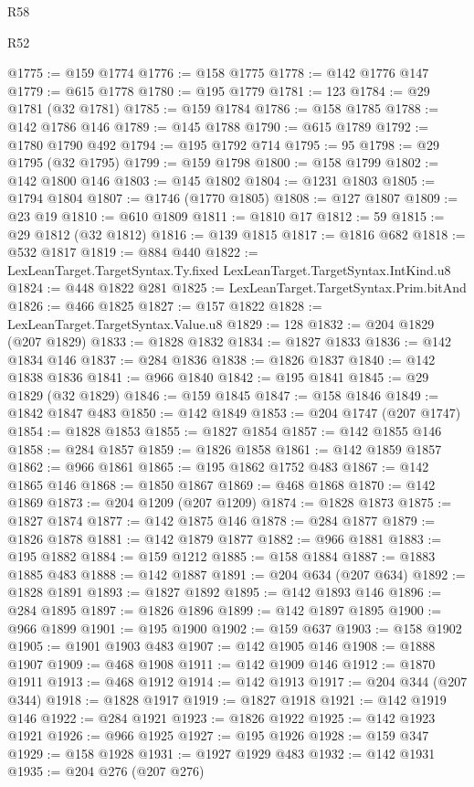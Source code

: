 \begin{lexlean}{R58}
\begin{lexlean}{R52}
\begin{coremodule}
{{{{{{{{{{{{{{{{{{{{{{{{{{{{{{{{{{{{{{{{{{{{{{{{{{{{{{{{{{{{{{{{{{{{{{{{{{{{{{{{{{{{{{{{{{{{{{{{{{{{{{{{{{{{{{{{{{{{{{{{{{{{{{{{{{{{{{{{{{{{{{{{{{{{{{{{{{{{{{{{{{{{{{{{{{{{{{{{{{{{{{{{{{{{{{{{{{{{{{@1775 := @159 @1774
@1776 := @158 @1775
@1778 := @142 @1776 @147
@1779 := @615 @1778
@1780 := @195 @1779
@1781 := 123
@1784 := @29 @1781 (@32 @1781)
@1785 := @159 @1784
@1786 := @158 @1785
@1788 := @142 @1786 @146
@1789 := @145 @1788
@1790 := @615 @1789
@1792 := @1780 @1790 @492
@1794 := @195 @1792 @714
@1795 := 95
@1798 := @29 @1795 (@32 @1795)
@1799 := @159 @1798
@1800 := @158 @1799
@1802 := @142 @1800 @146
@1803 := @145 @1802
@1804 := @1231 @1803
@1805 := @1794 @1804
@1807 := @1746 (@1770 @1805)
@1808 := @127 @1807
@1809 := @23 @19
@1810 := @610 @1809
@1811 := @1810 @17
@1812 := 59
@1815 := @29 @1812 (@32 @1812)
@1816 := @139 @1815
@1817 := @1816 @682
@1818 := @532 @1817
@1819 := @884 @440
@1822 := LexLeanTarget.TargetSyntax.Ty.fixed LexLeanTarget.TargetSyntax.IntKind.u8
@1824 := @448 @1822 @281
@1825 := LexLeanTarget.TargetSyntax.Prim.bitAnd
@1826 := @466 @1825
@1827 := @157 @1822
@1828 := LexLeanTarget.TargetSyntax.Value.u8
@1829 := 128
@1832 := @204 @1829 (@207 @1829)
@1833 := @1828 @1832
@1834 := @1827 @1833
@1836 := @142 @1834 @146
@1837 := @284 @1836
@1838 := @1826 @1837
@1840 := @142 @1838 @1836
@1841 := @966 @1840
@1842 := @195 @1841
@1845 := @29 @1829 (@32 @1829)
@1846 := @159 @1845
@1847 := @158 @1846
@1849 := @1842 @1847 @483
@1850 := @142 @1849
@1853 := @204 @1747 (@207 @1747)
@1854 := @1828 @1853
@1855 := @1827 @1854
@1857 := @142 @1855 @146
@1858 := @284 @1857
@1859 := @1826 @1858
@1861 := @142 @1859 @1857
@1862 := @966 @1861
@1865 := @195 @1862 @1752 @483
@1867 := @142 @1865 @146
@1868 := @1850 @1867
@1869 := @468 @1868
@1870 := @142 @1869
@1873 := @204 @1209 (@207 @1209)
@1874 := @1828 @1873
@1875 := @1827 @1874
@1877 := @142 @1875 @146
@1878 := @284 @1877
@1879 := @1826 @1878
@1881 := @142 @1879 @1877
@1882 := @966 @1881
@1883 := @195 @1882
@1884 := @159 @1212
@1885 := @158 @1884
@1887 := @1883 @1885 @483
@1888 := @142 @1887
@1891 := @204 @634 (@207 @634)
@1892 := @1828 @1891
@1893 := @1827 @1892
@1895 := @142 @1893 @146
@1896 := @284 @1895
@1897 := @1826 @1896
@1899 := @142 @1897 @1895
@1900 := @966 @1899
@1901 := @195 @1900
@1902 := @159 @637
@1903 := @158 @1902
@1905 := @1901 @1903 @483
@1907 := @142 @1905 @146
@1908 := @1888 @1907
@1909 := @468 @1908
@1911 := @142 @1909 @146
@1912 := @1870 @1911
@1913 := @468 @1912
@1914 := @142 @1913
@1917 := @204 @344 (@207 @344)
@1918 := @1828 @1917
@1919 := @1827 @1918
@1921 := @142 @1919 @146
@1922 := @284 @1921
@1923 := @1826 @1922
@1925 := @142 @1923 @1921
@1926 := @966 @1925
@1927 := @195 @1926
@1928 := @159 @347
@1929 := @158 @1928
@1931 := @1927 @1929 @483
@1932 := @142 @1931
@1935 := @204 @276 (@207 @276)
}}}}}}}}}}}}}}}}}}}}}}}}}}}}}}}}}}}}}}}}}}}}}}}}}}}}}}}}}}}}}}}}}}}}}}}}}}}}}}}}}}}}}}}}}}}}}}}}}}}}}}}}}}}}}}}}}}}}}}}}}}}}}}}}}}}}}}}}}}}}}}}}}}}}}}}}}}}}}}}}}}}}}}}}}}}}}}}}}}}}}}}}}}}}}}}}}}}}}}
\end{coremodule}
\end{lexlean}
\end{lexlean}
